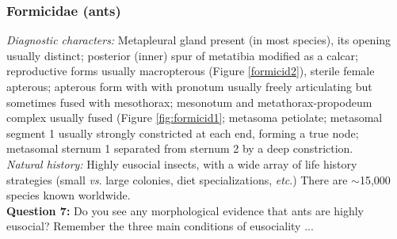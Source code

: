 \documentclass[letterpaper, 11pt]{article}
\begin{document}
\subsubsection{Formicidae (ants)}
\noindent{}\textit{Diagnostic characters:} Metapleural gland present (in most species), its opening usually distinct; posterior (inner) spur of metatibia modified as a calcar; reproductive forms usually macropterous (Figure \ref{formicid2}), sterile female apterous; apterous form with with pronotum usually freely articulating but sometimes fused with mesothorax; mesonotum and metathorax-propodeum complex usually fused (Figure \ref{fig:formicid1}; metasoma petiolate; metasomal segment 1 usually strongly constricted at each end, forming a true node; metasomal sternum 1 separated from sternum 2 by a deep constriction.\\

\noindent{}\textit{Natural history:} Highly eusocial insects, with a wide array of life history strategies (small \textit{vs}. large colonies, diet specializations, \textit{etc}.) There are $\sim$15,000 species known worldwide.\\

\noindent{}\textbf{Question 7:} Do you see any morphological evidence that ants are highly eusocial? Remember the three main conditions of eusociality ...\vspace{2cm}
\end{document}
